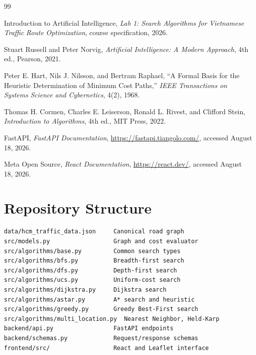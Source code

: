 \documentclass[12pt,a4paper,oneside]{report}
\begin{document}
\renewcommand{\bibname}{References}
\begin{thebibliography}{99}
{}
Introduction to Artificial Intelligence,
\textit{Lab 1: Search Algorithms for Vietnamese Traffic Route Optimization},
course specification, 2026.

Stuart Russell and Peter Norvig,
\textit{Artificial Intelligence: A Modern Approach}, 4th ed., Pearson, 2021.

Peter E. Hart, Nils J. Nilsson, and Bertram Raphael,
``A Formal Basis for the Heuristic Determination of Minimum Cost Paths,''
\textit{IEEE Transactions on Systems Science and Cybernetics}, 4(2), 1968.

Thomas H. Cormen, Charles E. Leiserson, Ronald L. Rivest, and Clifford Stein,
\textit{Introduction to Algorithms}, 4th ed., MIT Press, 2022.

FastAPI, \textit{FastAPI Documentation},
\url{https://fastapi.tiangolo.com/}, accessed August 18, 2026.

Meta Open Source, \textit{React Documentation},
\url{https://react.dev/}, accessed August 18, 2026.
\end{thebibliography}

\appendix
\chapter{Repository Structure}
\begin{verbatim}
data/hcm_traffic_data.json     Canonical road graph
src/models.py                  Graph and cost evaluator
src/algorithms/base.py         Common search types
src/algorithms/bfs.py          Breadth-first search
src/algorithms/dfs.py          Depth-first search
src/algorithms/ucs.py          Uniform-cost search
src/algorithms/dijkstra.py     Dijkstra search
src/algorithms/astar.py        A* search and heuristic
src/algorithms/greedy.py       Greedy Best-First search
src/algorithms/multi_location.py  Nearest Neighbor, Held-Karp
backend/api.py                 FastAPI endpoints
backend/schemas.py             Request/response schemas
frontend/src/                  React and Leaflet interface
\end{verbatim}
\end{document}
